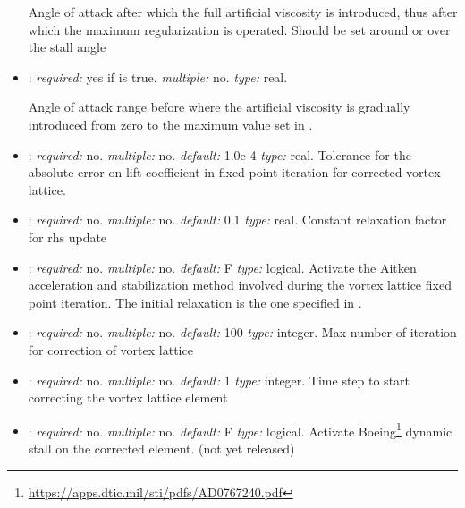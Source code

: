 \begin{itemize}
Angle of attack after which the full artificial viscosity is introduced, 
thus after which the maximum regularization is operated. Should be set 
around or over the stall angle

\item {}: \textit{required:} 
yes if  is true. \textit{multiple:} no. 
\textit{type:} real.

Angle of attack range before  
where the artificial viscosity is gradually introduced from zero to the maximum 
value set in .

\item {}: \textit{required:} no. \textit{multiple:} no. 
\textit{default:} 1.0e-4 \textit{type:} real. 
Tolerance for the absolute error on lift coefficient in fixed point 
iteration for corrected vortex lattice.

\item {}: \textit{required:} no. \textit{multiple:} no. 
\textit{default:} 0.1 \textit{type:} real. 
Constant relaxation factor for rhs update

\item {}: \textit{required:} no. \textit{multiple:} no. 
\textit{default:} F \textit{type:} logical. 
Activate the Aitken acceleration and stabilization method involved during the 
vortex lattice fixed point iteration. 
The initial relaxation is the one specified in . 

\item {}: \textit{required:} no. \textit{multiple:} no. 
\textit{default:} 100 \textit{type:} integer. 
Max number of iteration for correction of vortex lattice

\item {}: \textit{required:} no. \textit{multiple:} no. 
\textit{default:} 1 \textit{type:} integer. 
Time step to start correcting the vortex lattice element

\item {}: \textit{required:} no. \textit{multiple:} no. \textit{default:} F \textit{type:} logical. 
Activate Boeing\footnote{\url{https://apps.dtic.mil/sti/pdfs/AD0767240.pdf}} 
dynamic stall on the corrected  element.   (not yet released)


\end{itemize}

